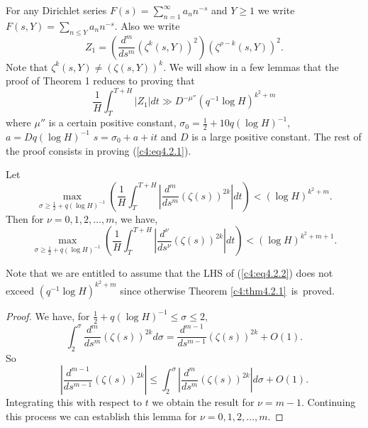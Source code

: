 For any Dirichlet series $F(s) = \sum\limits^\infty_{n=1} a_n n^{-s}$ and $Y \geq 1$ we write $F(s, Y) = \sum\limits_{n\leq Y} a_n n^{-s}$. Also we write
$$
Z_1 = \left(\frac{d^m}{ds^m} (\zeta^k (s,Y))^2 \right) (\zeta^{\rho-k} (s,Y))^2.
$$
Note that $\zeta^k (s,Y) \neq (\zeta (s,Y))^k$. We will show in a few lemmas that the proof of Theorem 1 reduces to proving that
\begin{equation*}
\frac{1}{H} \int^{T+H}_T  |Z_1| dt \gg D^{-\mu''} (q^{-1} \log H)^{k^2 + m}  \tag{4.2.1}\label{c4:eq4.2.1}
\end{equation*}
where $\mu''$ is a certain positive constant, $\sigma_0 =\frac{1}{2} + 10 q(\log H)^{-1}$, $a = Dq (\log H)^{-1}$ $s=\sigma_0 + a + it$ and $D$ is a large positive constant. The rest of the proof consists in proving (\ref{c4:eq4.2.1}).

\setcounter{lem}{0}
\begin{lem}\label{c4:lem1}
Let\pageoriginale
\begin{equation*}
\max\limits_{\sigma \geq \frac{1}{2} + q (\log H)^{-1}} \left(\frac{1}{H} \int^{T+H}_T |\frac{d^m}{ds^m}(\zeta (s))^{2k}| dt \right) < (\log H)^{k^2+m}.  \tag{4.2.2}\label{c4:eq4.2.2}
\end{equation*}
Then for $\nu = 0,1,2,\ldots , m$, we have,
\begin{equation*}
\max\limits_{\sigma \geq \frac{1}{2} +q(\log H)^{-1}} \left(\frac{1}{H} \int^{T+H}_T |\frac{d^\nu}{ds^\nu} (\zeta(s))^{2k}|dt\right) < (\log H)^{k^2 + m+1}. \tag{4.2.3}\label{c4:eq4.2.3}
\end{equation*}
\end{lem}

\begin{remark*}
Note that we are entitled to assume that the LHS of (\ref{c4:eq4.2.2})
does not exceed {\small $(q^{-1} \log H)^{k^2 + m}$} since otherwise Theorem
\ref{c4:thm4.2.1}~is~proved.  
\end{remark*}

\begin{proof}
We have, for $\frac{1}{2} + q(\log H)^{-1} \leq \sigma \leq 2$,
$$
\int^\sigma_2 \frac{d^m}{ds^m} (\zeta(s))^{2k} d\sigma = \frac{d^{m-1}}{ds^{m-1}} (\zeta(s))^{2k} + O(1).
$$
So
$$
|\frac{d^{m-1}}{ds^{m-1}} (\zeta(s))^{2k} | \leq \int^\sigma_2 |\frac{d^m}{ds^m} (\zeta(s))^{2k}| d\sigma + O(1).
$$
Integrating this with respect to $t$ we obtain the result for $\nu = m -1$. Continuing this process we can establish this lemma for $\nu = 0,1,2, \ldots, m$.
 \end{proof}

